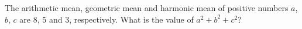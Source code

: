 The arithmetic mean, geometric mean and harmonic mean of positive numbers $a$, $b$, $c$ are $8$, $5$ and $3$, respectively. What is the value of $a^2+b^2+c^2$?
